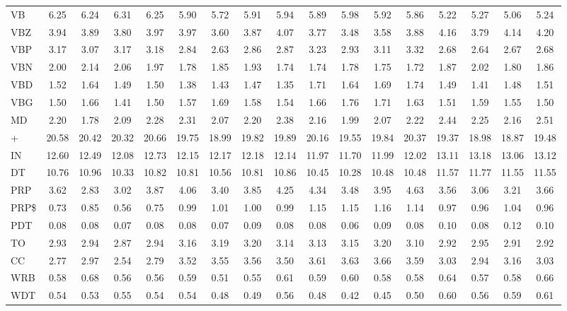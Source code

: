 \documentclass[%
 aip,
 jmp,%
 amsmath,amssymb,
 reprint,%
 floatfix,
]{revtex4-1}
\begin{document}
\begin{table}
\begin{tabular}{|l|| c|c|c|c||  c|c|c|c||   c|c|c|c||   c|c|c|c|}
VB & 6.25 & 6.24 & 6.31 & 6.25 & 5.90 & 5.72 & 5.91 & 5.94 & 5.89 & 5.98 & 5.92 & 5.86 & 5.22 & 5.27 & 5.06 & 5.24\\
VBZ & 3.94 & 3.89 & 3.80 & 3.97 & 3.97 & 3.60 & 3.87 & 4.07 & 3.77 & 3.48 & 3.58 & 3.88 & 4.16 & 3.79 & 4.14 & 4.20\\
VBP & 3.17 & 3.07 & 3.17 & 3.18 & 2.84 & 2.63 & 2.86 & 2.87 & 3.23 & 2.93 & 3.11 & 3.32 & 2.68 & 2.64 & 2.67 & 2.68\\
VBN & 2.00 & 2.14 & 2.06 & 1.97 & 1.78 & 1.85 & 1.93 & 1.74 & 1.74 & 1.78 & 1.75 & 1.72 & 1.87 & 2.02 & 1.80 & 1.86\\
VBD & 1.52 & 1.64 & 1.49 & 1.50 & 1.38 & 1.43 & 1.47 & 1.35 & 1.71 & 1.64 & 1.69 & 1.74 & 1.49 & 1.41 & 1.48 & 1.51\\
VBG & 1.50 & 1.66 & 1.41 & 1.50 & 1.57 & 1.69 & 1.58 & 1.54 & 1.66 & 1.76 & 1.71 & 1.63 & 1.51 & 1.59 & 1.55 & 1.50\\
MD & 2.20 & 1.78 & 2.09 & 2.28 & 2.31 & 2.07 & 2.20 & 2.38 & 2.16 & 1.99 & 2.07 & 2.22 & 2.44 & 2.25 & 2.16 & 2.51\\\hline
+ & 20.58 & 20.42 & 20.32 & 20.66 & 19.75 & 18.99 & 19.82 & 19.89 & 20.16 & 19.55 & 19.84 & 20.37 & 19.37 & 18.98 & 18.87 & 19.48\\\hline\hline
IN & 12.60 & 12.49 & 12.08 & 12.73 & 12.15 & 12.17 & 12.18 & 12.14 & 11.97 & 11.70 & 11.99 & 12.02 & 13.11 & 13.18 & 13.06 & 13.12\\
DT & 10.76 & 10.96 & 10.33 & 10.82 & 10.81 & 10.56 & 10.81 & 10.86 & 10.45 & 10.28 & 10.48 & 10.48 & 11.57 & 11.77 & 11.55 & 11.55\\
PRP & 3.62 & 2.83 & 3.02 & 3.87 & 4.06 & 3.40 & 3.85 & 4.25 & 4.34 & 3.48 & 3.95 & 4.63 & 3.56 & 3.06 & 3.21 & 3.66\\
PRP\$ & 0.73 & 0.85 & 0.56 & 0.75 & 0.99 & 1.01 & 1.00 & 0.99 & 1.15 & 1.15 & 1.16 & 1.14 & 0.97 & 0.96 & 1.04 & 0.96\\
PDT & 0.08 & 0.08 & 0.07 & 0.08 & 0.08 & 0.07 & 0.09 & 0.08 & 0.08 & 0.06 & 0.09 & 0.08 & 0.10 & 0.08 & 0.12 & 0.10\\
TO & 2.93 & 2.94 & 2.87 & 2.94 & 3.16 & 3.19 & 3.20 & 3.14 & 3.13 & 3.15 & 3.20 & 3.10 & 2.92 & 2.95 & 2.91 & 2.92\\
CC & 2.77 & 2.97 & 2.54 & 2.79 & 3.52 & 3.55 & 3.56 & 3.50 & 3.61 & 3.63 & 3.66 & 3.59 & 3.03 & 2.94 & 3.16 & 3.03\\
WRB & 0.58 & 0.68 & 0.56 & 0.56 & 0.59 & 0.51 & 0.55 & 0.61 & 0.59 & 0.60 & 0.58 & 0.58 & 0.64 & 0.57 & 0.58 & 0.66\\
WDT & 0.54 & 0.53 & 0.55 & 0.54 & 0.54 & 0.48 & 0.49 & 0.56 & 0.48 & 0.42 & 0.45 & 0.50 & 0.60 & 0.56 & 0.59 & 0.61\\

\end{tabular}
\end{table}
\end{document}
